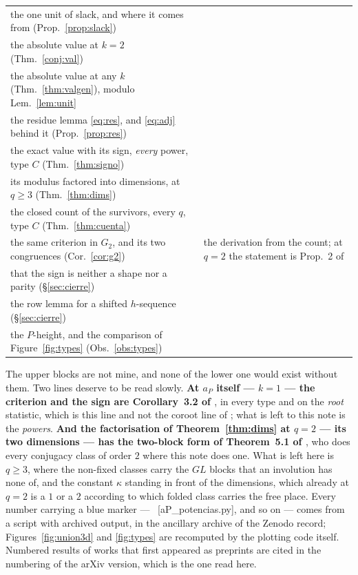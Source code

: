 \documentclass[11pt,a4paper]{article}
\theoremstyle{definition}
\newcommand{\ver}[1]{\unskip\penalty0\ \textcolor{azul}{\small\textsf{[#1]}}}
\begin{document}
{\begin{longtable}{@{}p{}p{}@{}}
the one unit of slack, and where it comes from (Prop.~\ref{prop:slack}) & \\
the absolute value at $k=2$ (Thm.~\ref{conj:val}) & \\
the absolute value at any $k$ (Thm.~\ref{thm:valgen}), modulo Lem.~\ref{lem:unit} & \\
the residue lemma \eqref{eq:res}, and \eqref{eq:adj} behind it (Prop.~\ref{prop:res}) & \\
the exact value with its sign, \emph{every} power, type $C$ (Thm.~\ref{thm:signo}) & \\
its modulus factored into dimensions, at $q\ge3$ (Thm.~\ref{thm:dims}) & \\
the closed count of the survivors, every $q$, type $C$ (Thm.~\ref{thm:cuenta}) & \\
the same criterion in $G_2$, and its two congruences (Cor.~\ref{cor:g2}) & the derivation from the count; at $q=2$ the statement is Prop.~2 of \cite{Kar24}\\
that the sign is neither a shape nor a parity (\S\ref{sec:cierre}) & \\
the row lemma for a shifted $h$-sequence (\S\ref{sec:cierre}) & \\
the $P$-height, and the comparison of Figure~\ref{fig:types} (Obs.~\ref{obs:types}) & \\
\bottomrule
\end{longtable}}

\vspace{3pt}
\noindent The upper blocks are not mine, and none of the lower one would exist without them. Two
lines deserve to be read slowly. \textbf{At $a_P$ itself --- $k=1$ --- the criterion and the sign
are Corollary~3.2 of \cite{CMP06}}, in every type and on the \emph{root} statistic, which is this
line and not the coroot line of \cite{NPP25}; what is left to this note is the \emph{powers}.
\textbf{And the factorisation of Theorem~\ref{thm:dims} at $q=2$ --- its two dimensions ---
has the two-block form of Theorem~5.1 of \cite{Kar24}}, who does every conjugacy class of order $2$ where this note
does one. What is left here is $q\ge3$, where the non-fixed classes carry the $GL$ blocks that
an involution has none of, and the constant $\kappa$ standing in front of the dimensions, which
already at $q=2$ is a $1$ or a $2$ according to which folded class carries the free place. Every number carrying a
blue marker --- \ver{aP\_potencias.py}, and so on --- comes from a script with archived output,
in the ancillary archive of the Zenodo record; Figures~\ref{fig:union3d} and \ref{fig:types} are recomputed by the plotting
code itself. Numbered results of works that first appeared as preprints are cited in the numbering
of the arXiv version, which is the one read here.
\end{document}
